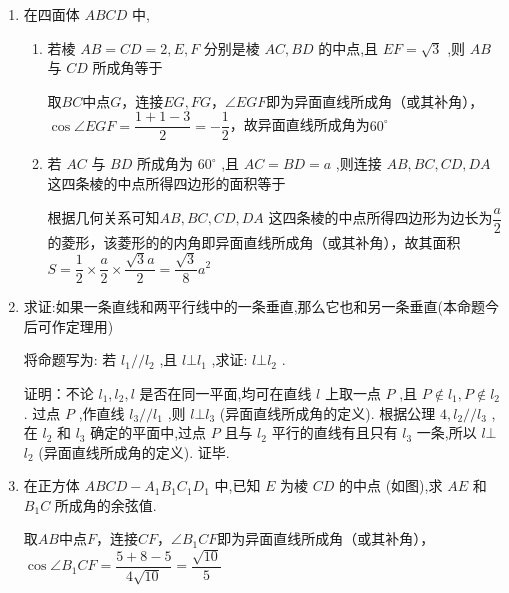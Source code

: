 \begin{enumerate}
\begin{enumerate}
\begin{jieda}
            $\angle{DA_1C_1}$即为异面直线所成角（或其补角） $\cos \angle DA_1C_1 = \dfrac{6+4-4}{4\sqrt{6}} = \dfrac{\sqrt{6}}{4}$ .
        \end{jieda}
        \item 若底面边长 ${AB} = {BC} = 3$ ,棱 $A{A}_{1} = 4$ ,则异面直线 $A{B}_{1}$ 与 ${A}_{1}D$ 所成角的余弦值等于
        \begin{jieda}
            $\angle{AB_1C}$即为异面直线所成角（或其补角） $\cos \angle AB_1C = \dfrac{25+25-18}{50} = \dfrac{16}{25}$ 
        \end{jieda}
    \end{enumerate}
    \clearpage
    \item 在四面体 ${ABCD}$ 中,
    \begin{enumerate}
        \item 若棱 ${AB} = {CD} = 2,E,F$ 分别是棱 ${AC},{BD}$ 的中点,且 ${EF} = \sqrt{3}$ ,则 ${AB}$ 与 ${CD}$ 所成角等于
        \begin{jieda}
            取$BC$中点$G$，连接$EG, FG$，$\angle{EGF}$即为异面直线所成角（或其补角），$\cos \angle EGF = \dfrac{1+1-3}{2} = -\dfrac{1}{2}$，故异面直线所成角为$60^\circ$
        \end{jieda}
        \item 若 ${AC}$ 与 ${BD}$ 所成角为 ${60}^{ \circ  }$ ,且 ${AC} = {BD} = a$ ,则连接 ${AB},{BC},{CD},{DA}$ 这四条棱的中点所得四边形的面积等于
        \begin{jieda}
            根据几何关系可知${AB},{BC},{CD},{DA}$ 这四条棱的中点所得四边形为边长为$\dfrac{a}{2}$的菱形，该菱形的的内角即异面直线所成角（或其补角），故其面积$S = \dfrac{1}{2}\times \dfrac{a}{2} \times \dfrac{\sqrt{3}a}{2} = \dfrac{\sqrt{3}}{8}{a}^{2}$
        \end{jieda}
    \end{enumerate}
    \item 求证:如果一条直线和两平行线中的一条垂直,那么它也和另一条垂直(本命题今后可作定理用)
    \begin{jieda}
        将命题写为: 若 ${l}_{1}//{l}_{2}$ ,且 $l \bot  {l}_{1}$ ,求证: $l \bot  {l}_{2}$ .
        
        证明：不论 ${l}_{1},{l}_{2},l$ 是否在同一平面,均可在直线 $l$ 上取一点 $P$ ,且 $P \notin  {l}_{1},P \notin  {l}_{2}$ . 过点 $P$ ,作直线 ${l}_{3}//{l}_{1}$ ,则 $l\bot {l}_{3}$ (异面直线所成角的定义). 根据公理 $4,{l}_{2}//{l}_{3}$ ,在 ${l}_{2}$ 和 ${l}_{3}$ 确定的平面中,过点 $P$ 且与 ${l}_{2}$ 平行的直线有且只有 ${l}_{3}$ 一条,所以 $l \bot$  ${l}_{2}$ (异面直线所成角的定义). 证毕.
    \end{jieda}
    \item 在正方体 ${ABCD} - {A}_{1}{B}_{1}{C}_{1}{D}_{1}$ 中,已知 $E$ 为棱 ${CD}$ 的中点 (如图),求 ${AE}$ 和 ${B}_{1}C$ 所成角的余弦值.
    \begin{jieda}
        取$AB$中点$F$，连接$CF$，$\angle{B_1CF}$即为异面直线所成角（或其补角），$\cos \angle B_1CF = \dfrac{5+8-5}{4\sqrt{10}} = \dfrac{\sqrt{10}}{5}$
    \end{jieda}
    

\end{enumerate}
